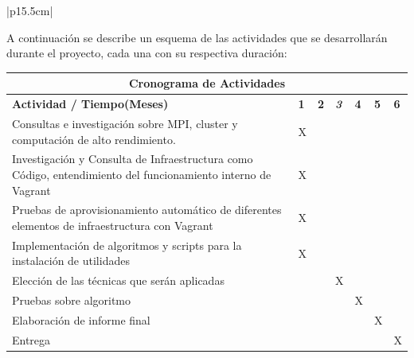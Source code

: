 \documentclass[letter,12pt]{article}
\begin{document}
\begin{center}
\begin{tabular}{|p{15.5cm}|}
\hline
{}\\
\hline

A continuación se describe un esquema de las actividades que se desarrollarán durante el proyecto, cada una con su respectiva duración:
    
    \begin{center}
    \begin{tabular}{|p{9.5cm}|p{0.4cm}|p{0.4cm}|p{0.4cm}|p{0.4cm}|p{0.4cm}|p{0.4cm}|}
    \hline
    \multicolumn{7}{|c|}{\textbf{Cronograma de Actividades}}\\
    \hline
    \textbf{Actividad / Tiempo(Meses)} & \textbf{1} & \textbf{2} & \textit{\textbf{3}} & \textbf{4} & \textbf{5} & \textbf{6} \\
    \hline
    Consultas e investigación sobre MPI, cluster y computación de alto rendimiento. & X &   &   &   &   &   \\
    \hline
    Investigación y Consulta de Infraestructura como Código, entendimiento del funcionamiento interno de Vagrant & X &   &   &   &   &   \\
    \hline
    Pruebas de aprovisionamiento automático de diferentes elementos de infraestructura con Vagrant & X &   &   &   &   &   \\
    \hline
    Implementación de algoritmos y scripts para la instalación de utilidades & X &   &   &   &   &   \\
    \hline
    Elección de las técnicas que serán aplicadas &   &   & X &   &   &   \\
    \hline
    Pruebas sobre algoritmo &   &   &   & X &   &   \\
    \hline
    Elaboración de informe final &   &   &   &   & X &   \\
    \hline
    Entrega &   &   &   &   &   & X \\
    \hline
    \end{tabular}
    \end{center} \\

\hline
\end{tabular}
\end{center}
\end{document}
